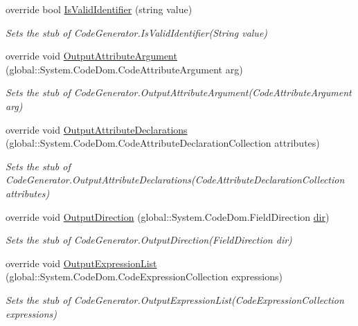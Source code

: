 \begin{DoxyCompactItemize}
override bool \hyperlink{class_system_1_1_code_dom_1_1_compiler_1_1_fakes_1_1_stub_code_compiler_ad721506c1ef6bd4dfcdca2618ff9a2c9}{Is\-Valid\-Identifier} (string value)
\begin{DoxyCompactList}\small\item\em Sets the stub of Code\-Generator.\-Is\-Valid\-Identifier(\-String value)\end{DoxyCompactList}\item 
override void \hyperlink{class_system_1_1_code_dom_1_1_compiler_1_1_fakes_1_1_stub_code_compiler_aac9d3072f7f8c0cc0e6d8d88e4c5a3db}{Output\-Attribute\-Argument} (global\-::\-System.\-Code\-Dom.\-Code\-Attribute\-Argument arg)
\begin{DoxyCompactList}\small\item\em Sets the stub of Code\-Generator.\-Output\-Attribute\-Argument(\-Code\-Attribute\-Argument arg)\end{DoxyCompactList}\item 
override void \hyperlink{class_system_1_1_code_dom_1_1_compiler_1_1_fakes_1_1_stub_code_compiler_aabfa9e3038fcc1d46ce880b6cc16a93c}{Output\-Attribute\-Declarations} (global\-::\-System.\-Code\-Dom.\-Code\-Attribute\-Declaration\-Collection attributes)
\begin{DoxyCompactList}\small\item\em Sets the stub of Code\-Generator.\-Output\-Attribute\-Declarations(\-Code\-Attribute\-Declaration\-Collection attributes)\end{DoxyCompactList}\item 
override void \hyperlink{class_system_1_1_code_dom_1_1_compiler_1_1_fakes_1_1_stub_code_compiler_a7bba9d3ca7ff9d90eaab7af4444b9c9c}{Output\-Direction} (global\-::\-System.\-Code\-Dom.\-Field\-Direction \hyperlink{jquery-1_810_82-vsdoc_8js_a49baab980d9b27347df35195d88ef25f}{dir})
\begin{DoxyCompactList}\small\item\em Sets the stub of Code\-Generator.\-Output\-Direction(\-Field\-Direction dir)\end{DoxyCompactList}\item 
override void \hyperlink{class_system_1_1_code_dom_1_1_compiler_1_1_fakes_1_1_stub_code_compiler_ac6e05b156a4e43c5d6dff5241ba7a343}{Output\-Expression\-List} (global\-::\-System.\-Code\-Dom.\-Code\-Expression\-Collection expressions)
\begin{DoxyCompactList}\small\item\em Sets the stub of Code\-Generator.\-Output\-Expression\-List(\-Code\-Expression\-Collection expressions)\end{DoxyCompactList}\item 

\end{DoxyCompactItemize}
